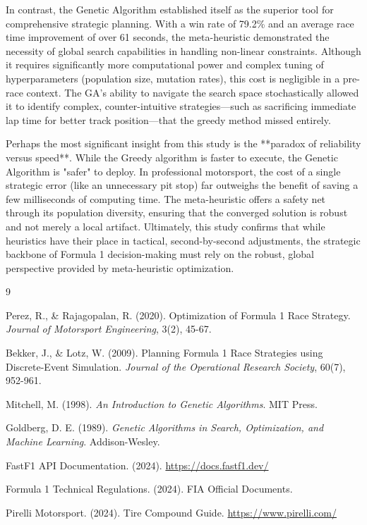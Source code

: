 \documentclass[10pt]{article}
\begin{document}
In contrast, the Genetic Algorithm established itself as the superior tool for comprehensive strategic planning.
With a win rate of 79.2\% and an average race time improvement of over 61 seconds, the meta-heuristic demonstrated the necessity of global search capabilities in handling non-linear constraints.
Although it requires significantly more computational power and complex tuning of hyperparameters (population size, mutation rates), this cost is negligible in a pre-race context.
The GA's ability to navigate the search space stochastically allowed it to identify complex, counter-intuitive strategies—such as sacrificing immediate lap time for better track position—that the greedy method missed entirely.

Perhaps the most significant insight from this study is the **paradox of reliability versus speed**.
While the Greedy algorithm is faster to execute, the Genetic Algorithm is "safer" to deploy.
In professional motorsport, the cost of a single strategic error (like an unnecessary pit stop) far outweighs the benefit of saving a few milliseconds of computing time.
The meta-heuristic offers a safety net through its population diversity, ensuring that the converged solution is robust and not merely a local artifact.
Ultimately, this study confirms that while heuristics have their place in tactical, second-by-second adjustments, the strategic backbone of Formula 1 decision-making must rely on the robust, global perspective provided by meta-heuristic optimization.

\begin{thebibliography}{9}

Perez, R., \& Rajagopalan, R. (2020).
Optimization of Formula 1 Race Strategy. 
\textit{Journal of Motorsport Engineering}, 3(2), 45-67.

Bekker, J., \& Lotz, W. (2009).
Planning Formula 1 Race Strategies using Discrete-Event Simulation. 
\textit{Journal of the Operational Research Society}, 60(7), 952-961.

Mitchell, M. (1998).
\textit{An Introduction to Genetic Algorithms}. 
MIT Press.

Goldberg, D. E. (1989). 
\textit{Genetic Algorithms in Search, Optimization, and Machine Learning}. 
Addison-Wesley.

FastF1 API Documentation. (2024). 
\url{https://docs.fastf1.dev/}

Formula 1 Technical Regulations. (2024). 
FIA Official Documents.

Pirelli Motorsport. (2024). 
Tire Compound Guide.
\url{https://www.pirelli.com/}

\end{thebibliography}
\end{document}
